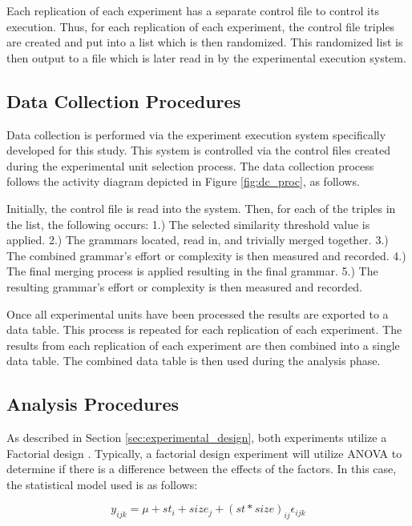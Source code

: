 \documentclass[10pt,nocc]{xrese_report}
\begin{document}
\noindent Each replication of each experiment has a separate control file to control its execution. Thus, for each replication of each experiment, the control file triples are created and put into a list which is then randomized. This randomized list is then output to a file which is later read in by the experimental execution system.

\subsection{Data Collection Procedures}

Data collection is performed via the experiment execution system specifically developed for this study. This system is controlled via the control files created during the experimental unit selection process. The data collection process follows the activity diagram depicted in Figure \ref{fig:dc_proc}, as follows.

Initially, the control file is read into the system. Then, for each of the triples in the list, the following occurs: 1.) The selected similarity threshold value is applied. 2.) The grammars located, read in, and trivially merged together. 3.) The combined grammar's effort or complexity is then measured and recorded. 4.) The final merging process is applied resulting in the final grammar. 5.) The resulting grammar's effort or complexity is then measured and recorded.

Once all experimental units have been processed the results are exported to a data table. This process is repeated for each replication of each experiment. The results from each replication of each experiment are then combined into a single data table. The combined data table is then used during the analysis phase.

\subsection{Analysis Procedures}

As described in Section \ref{sec:experimental_design}, both experiments utilize a Factorial design \cite{montgomery_design_2013}. Typically, a factorial design experiment will utilize ANOVA to determine if there is a difference between the effects of the factors. In this case, the statistical model used is as follows:

\[y_{ijk} = \mu + st_i + size_j + (st * size)_{ij} \epsilon_{ijk}\]
\end{document}
